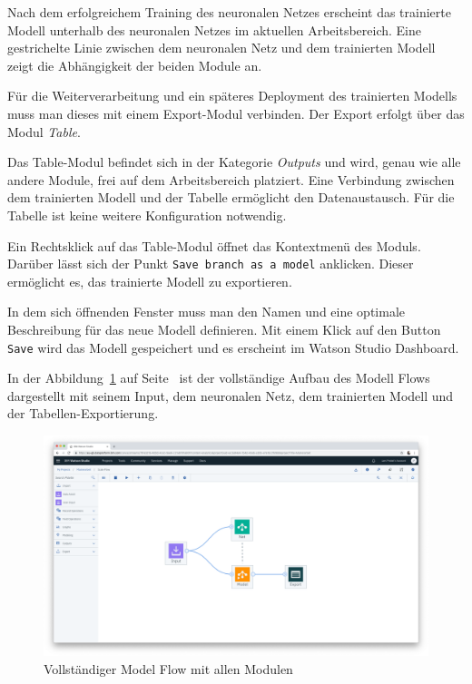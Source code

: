 Nach dem erfolgreichem Training des neuronalen Netzes erscheint das trainierte Modell unterhalb des neuronalen Netzes im
aktuellen Arbeitsbereich. Eine gestrichelte Linie zwischen dem neuronalen Netz und dem trainierten Modell zeigt die
Abhängigkeit der beiden Module an.

Für die Weiterverarbeitung und ein späteres Deployment des trainierten Modells muss man dieses mit einem Export-Modul
verbinden. Der Export erfolgt über das Modul \textit{Table}.

Das Table-Modul befindet sich in der Kategorie \textit{Outputs} und wird, genau wie alle andere Module, frei auf dem
Arbeitsbereich platziert. Eine Verbindung zwischen dem trainierten Modell und der Tabelle ermöglicht den Datenaustausch.
Für die Tabelle ist keine weitere Konfiguration notwendig.

Ein Rechtsklick auf das Table-Modul öffnet das Kontextmenü des Moduls. Darüber lässt sich der Punkt
\texttt{Save branch as a model} anklicken. Dieser ermöglicht es, das trainierte Modell zu exportieren.

In dem sich öffnenden Fenster muss man den Namen und eine optimale Beschreibung für das neue Modell definieren. Mit
einem Klick auf den Button \texttt{Save} wird das Modell gespeichert und es erscheint im Watson Studio Dashboard.

In der Abbildung~\ref{fig:umsetzung_model_flow} auf Seite~\pageref{fig:umsetzung_model_flow} ist der vollständige Aufbau
des Modell Flows dargestellt mit seinem Input, dem neuronalen Netz, dem trainierten Modell und der
Tabellen-Exportierung.

\begin{figure}[h]
    \centering
    \includegraphics[width=\textwidth]{images/kapitel_3/umsetzung_model_flow.png}
    \caption{Vollständiger Model Flow mit allen Modulen}
    \label{fig:umsetzung_model_flow}
\end{figure}

